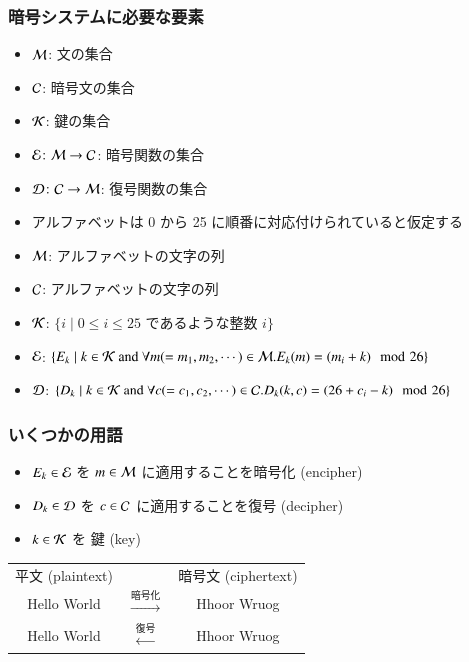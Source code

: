 \begin{frame}
\frametitle{暗号システムに必要な要素}
  \begin{itemize}
\item $\cal M$: 文の集合
\item $\cal C$: 暗号文の集合
\item $\cal K$: 鍵の集合
\item \(\cal E\colon M\rightarrow C\): 暗号関数の集合
\item \(\cal D\colon C\rightarrow M\): 復号関数の集合
  \end{itemize}
  \begin{example}
\scriptsize
    \begin{itemize}
\item アルファベットは 0 から 25 に順番に対応付けられていると仮定する
\item $\cal M$: アルファベットの文字の列
\item $\cal C$: アルファベットの文字の列
\item $\cal K$: \(\{i\mid 0\leq i\leq 25\) であるような整数 $i\}$
\item \(\cal E\): \(\{E_k\mid k\in{\cal K}\ \mbox{and}\ \forall m(=m_1,m_2,\cdots)\in {\cal M}.E_k(m)=(m_i+k)\mod 26\}\)
\item \(\cal D\): \(\{D_k\mid k\in{\cal K}\ \mbox{and}\ \forall c(=c_1,c_2,\cdots)\in {\cal C}.D_k(k,c)=(26+c_i-k)\mod 26\}\)
    \end{itemize}
  \end{example}
\end{frame}
\begin{frame}
\frametitle{いくつかの用語}
  \begin{itemize}
\item \(E_k\in{\cal E}\) を \(m\in{\cal M}\) に適用することを暗号化 (encipher)
\item \(D_k\in{\cal D}\) を \(c\in{\cal C}\) に適用することを復号 (decipher)
\item \(k\in{\cal K}\) を 鍵 (key)
  \end{itemize}
  \begin{center}
    \begin{tabular}{ccc}
平文 (plaintext)&&暗号文 (ciphertext)\\
Hello World&$\stackrel{\mbox{暗号化}}{\rightarrow}$&Hhoor Wruog\\
Hello World&$\stackrel{\mbox{復号}}{\leftarrow}$&Hhoor Wruog
    \end{tabular}
  \end{center}
\end{frame}
